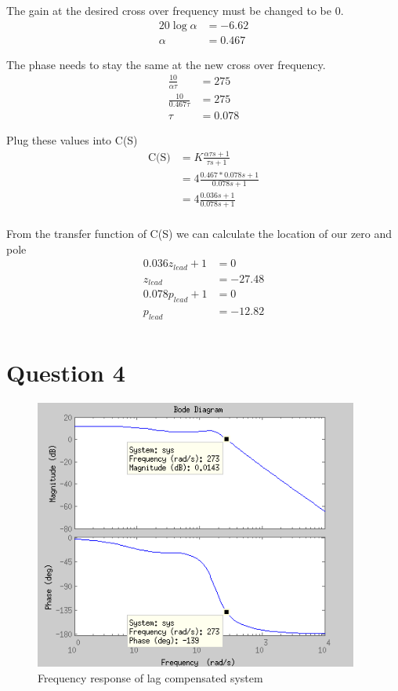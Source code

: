 \documentclass{article}
\begin{document}
The gain at the desired cross over frequency must be changed to be 0.
\begin{align*}
    20\log \alpha &= -6.62\\
    \alpha &= 0.467
\end{align*}

The phase needs to stay the same at the new cross over frequency.
\begin{align*}
\frac{10}{\alpha \tau} &= 275\\
\frac{10}{0.467 \tau} &= 275\\
\tau &= 0.078
\end{align*}

Plug these values into C(S)
\begin{align*}
\text{C(S)} &= K\frac{\alpha\tau s + 1}{\tau s + 1}\\
    &= 4\frac{0.467 * 0.078 s + 1}{0.078 s + 1}\\
    &= 4\frac{0.036 s + 1}{0.078 s + 1}\\
\end{align*}

From the transfer function of C(S) we can calculate the location of our zero and pole
\begin{align*}
0.036 z_{lead} + 1 &= 0\\
z_{lead} &= -27.48\\
0.078p_{lead} + 1 &= 0\\
p_{lead} &= -12.82\\
\end{align*}

\section{Question 4} %
\label{sec:question_4}

\begin{figure}[!htbp]
    \centering
    \includegraphics[width=0.95\textwidth]{sim_lag_rad.png}
    \caption{Frequency response of lag compensated system}
\end{figure}
\end{document}
